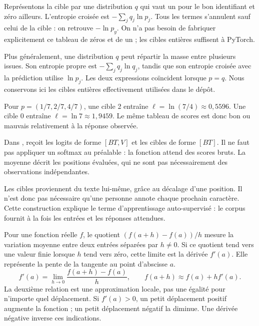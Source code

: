 Représentons la cible par une distribution \(q\) qui vaut un
pour le bon identifiant et zéro ailleurs. L'entropie croisée
est \(-\sum_j q_j\ln p_j\). Tous les termes s'annulent
sauf celui de la cible : on retrouve \(-\ln p_y\).
On n'a pas besoin de fabriquer explicitement ce tableau de zéros
et de un ; les cibles entières suffisent à PyTorch.

Plus généralement, une distribution \(q\) peut répartir la
masse entre plusieurs issues. Son entropie propre est
\(-\sum_j q_j\ln q_j\), tandis que son entropie croisée avec
la prédiction utilise \(\ln p_j\). Les deux expressions
coïncident lorsque \(p=q\). Nous conservons ici les cibles
entières effectivement utilisées dans le dépôt.

Pour \(p=(1/7,2/7,4/7)\), une cible 2 entraîne
\(\ell=\ln(7/4)\approx0{,}5596\). Une cible 0 entraîne
\(\ell=\ln7\approx1{,}9459\). Le même tableau de scores
est donc bon ou mauvais relativement à la réponse observée.

Dans ,  reçoit
les logits de forme \([BT,V]\) et les cibles de forme \([BT]\).
Il ne faut pas appliquer un softmax au préalable : la fonction
attend des scores bruts. La moyenne décrit les positions
évaluées, qui ne sont pas nécessairement des observations indépendantes.

Les cibles proviennent du texte lui-même, grâce au décalage
d'une position. Il n'est donc pas nécessaire qu'une personne
annote chaque prochain caractère. Cette construction explique
le terme d'apprentissage auto-supervisé : le corpus fournit
à la fois les entrées et les réponses attendues.



Pour une fonction réelle \(f\), le quotient
\((f(a+h)-f(a))/h\) mesure la variation moyenne entre
deux entrées séparées par \(h\neq0\). Si ce quotient tend
vers une valeur finie lorsque \(h\) tend vers zéro,
cette limite est la dérivée \(f'(a)\).
Elle représente la pente de la tangente au point d'abscisse \(a\).
\[
 f'(a)=\lim_{h\to0}\frac{f(a+h)-f(a)}{h},
 \qquad f(a+h)\approx f(a)+hf'(a).
\]
La deuxième relation est une approximation locale, pas une
égalité pour n'importe quel déplacement. Si \(f'(a)>0\),
un petit déplacement positif augmente la fonction ; un petit
déplacement négatif la diminue. Une dérivée négative inverse
ces indications.

